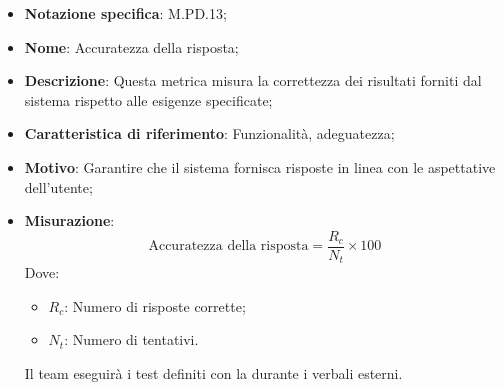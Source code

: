 \begin{itemize}
    \item \textbf{Notazione specifica}: M.PD.13;
    \item \textbf{Nome}: Accuratezza della risposta;
    \item \textbf{Descrizione}: Questa metrica misura la correttezza dei risultati forniti dal sistema rispetto alle esigenze specificate;
    \item \textbf{Caratteristica di riferimento}: Funzionalità, adeguatezza;
    \item \textbf{Motivo}: Garantire che il sistema fornisca risposte in linea con le aspettative dell'utente;
    \item \textbf{Misurazione}:
    \[
    \text{Accuratezza della risposta} = \frac{R_{c}}{N_{t}} \times 100
    \]
    Dove:
    \begin{itemize}
        \item $R_{c}$: Numero di risposte corrette;
        \item $N_{t}$: Numero di tentativi.
    \end{itemize}
    \par Il team eseguirà i test definiti con la  durante i verbali esterni.
 \end{itemize}
